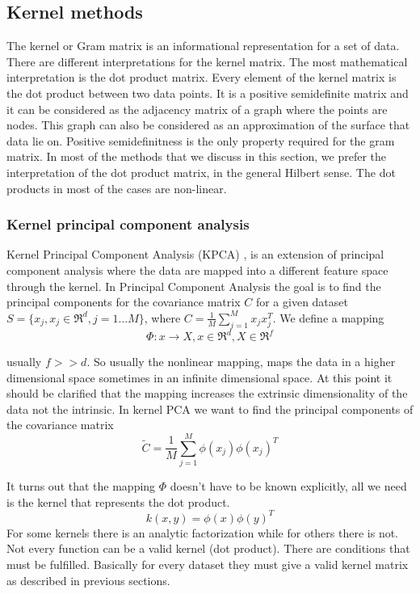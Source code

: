 \documentclass[12pt,letterpaper,doublespaced,ETD,dvips,proposal]{gtthesis}
\begin{document}
\begin{Body}
\subsection{Kernel methods}
\label{Kernel_methods}

The kernel or Gram matrix is an informational representation
for a set of data. There are  different interpretations for the
kernel matrix. The most mathematical interpretation is the dot
product matrix. Every element of the kernel matrix is the dot
product between two data points. It is a positive semidefinite
matrix and it can be considered as the adjacency matrix of a graph
where the points are nodes. This graph can also be considered as an
approximation of the surface that data lie on. Positive
semidefinitness is the only property required for the gram matrix.
In most of the methods that we discuss in this section, we prefer
the interpretation of the dot product matrix, in the general Hilbert
sense. The dot products in most of the cases are non-linear.

\subsubsection{Kernel principal component analysis}
\label{Kernel_principal_component_analysis}

Kernel Principal Component Analysis (KPCA) \cite{scholkopf2002lks}, is an extension of
principal component analysis where the data are mapped into a
different feature space through the kernel. In Principal Component
Analysis the goal is to find the principal components for  the
covariance matrix $C$ for a given dataset $S=\{x_j, x_j\in \Re^d, j=1
\dots M\}$, where $C=\frac{1}{M}\sum_{j=1}^{M}x_j x_j^T$. We
define a mapping
\begin{equation}
\Phi : x \rightarrow X , x \in \Re^d, X\in \Re^f
\end{equation}

usually $f>>d$. So usually the nonlinear mapping, maps the data in a
higher dimensional space sometimes in an infinite dimensional space.
At this point it should be clarified that the mapping increases the
extrinsic dimensionality of the data not the intrinsic. In kernel PCA we
want to find the principal components of the covariance matrix
\begin{equation}
\tilde{C} = \frac{1}{M}\sum_{j=1}^{M}\phi(x_j)\phi(x_j)^T
\end{equation}

It turns out that the mapping $\Phi$ doesn't have to be known
explicitly, all we need is the kernel that represents the dot
product.
\begin{equation}
k(x, y) = \phi(x)\phi(y)^T
\end{equation}
For some kernels there is an analytic factorization while for others
there is not. Not every function can be a valid kernel (dot
product). There are conditions that must be fulfilled. Basically for
every dataset they  must give a valid kernel matrix as described in
previous sections.


\end{Body}
\end{document}
